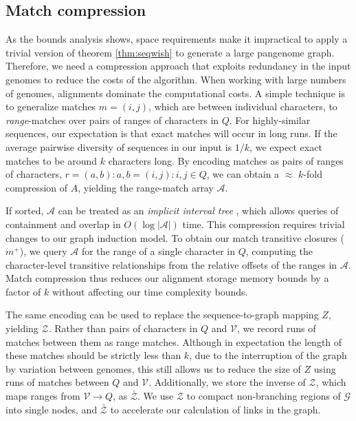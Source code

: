 \documentclass{bioinfo}
\theoremstyle{definition}
\begin{document}

\subsection{Match compression}
\label{sec:matchcompression}

As the bounds analysis shows, space requirements make it impractical to apply a trivial version of theorem \ref{thm:seqwish} to generate a large pangenome graph.
Therefore, we need a compression approach that exploits redundancy in the input genomes to reduce the costs of the algorithm.
When working with large numbers of genomes, alignments dominate the computational costs.
A simple technique is to generalize matches $m = (i, j)$, which are between individual characters, to \textit{range}-matches over pairs of ranges of characters in $Q$.
For highly-similar sequences, our expectation is that exact matches will occur in long runs.
If the average pairwise diversity of sequences in our input is $1/k$, we expect exact matches to be around $k$ characters long.
By encoding matches as pairs of ranges of characters, $r = (a, b) : a, b = (i, j) : i, j \in Q$, we can obtain a $\approx$ $k$-fold compression of $A$, yielding the range-match array $\mathcal{A}$.

If sorted, $\mathcal{A}$ can be treated as an \textit{implicit interval tree} \citep{Li_bedtk_2020}, which allows queries of containment and overlap in $O(\log |\mathcal{A}|)$ time.
This compression requires trivial changes to our graph induction model.
To obtain our match transitive closures ($m^+$), we query $\mathcal{A}$ for the range of a single character in $Q$, computing the character-level transitive relationships from the relative offsets of the ranges in $\mathcal{A}$.
Match compression thus reduces our alignment storage memory bounds by a factor of $k$ without affecting our time complexity bounds.

The same encoding can be used to replace the sequence-to-graph mapping $Z$, yielding $\mathcal{Z}$.
Rather than pairs of characters in $Q$ and $\mathcal{V}$, we record runs of matches between them as range matches.
Although in expectation the length of these matches should be strictly less than $k$, due to the interruption of the graph by variation between genomes, this still allows us to reduce the size of $Z$ using runs of matches between $Q$ and $\mathcal{V}$.
Additionally, we store the inverse of $\mathcal{Z}$, which maps ranges from $\mathcal{V} \to Q$, as $\bar{\mathcal{Z}}$.
We use $\mathcal{Z}$ to compact non-branching regions of $\mathcal{G}$ into single nodes, and $\bar{\mathcal{Z}}$ to accelerate our calculation of links in the graph.
\end{document}
